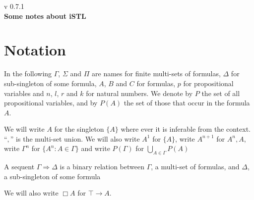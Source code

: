 \documentclass[a4paper, 12pt]{paper}
\begin{document}
{\noindent
	v 0.7.1 \\
{\large\textbf{Some notes about iSTL}}
}
\\
\setcounter{section}{-1}
\section{Notation} In the following $\Gamma$, $\Sigma$ and $\Pi$ are names for finite multi-sets of formulas, $\Delta$ for sub-singleton of some formula, $A$, $B$ and $C$ for formulas, $p$ for propositional variables and $n$, $l$, $r$ and $k$ for natural numbers. We denote by $P$ the set of all propositional variables, and by $P(A)$ the set of those that occur in the formula $A$.

We will write $A$ for the singleton $\{A\}$ where ever it is inferable from the context.
``$,$'' is the multi-set union.
We will also write $A^1$ for $\{A\}$, write $A^{n+1}$ for $A^n, A$, write $\Gamma^n$ for $\{ A^n : A \in \Gamma \}$ and write $P(\Gamma)$ for $\bigcup_{A \in \Gamma} P(A)$

A sequent $\Gamma \Rightarrow \Delta$ is a binary relation between $\Gamma$, a multi-set of formulas, and $\Delta$, a sub-singleton of some formula

We will also write $\Box A$ for $\top \rightarrow A$.










\end{document}
